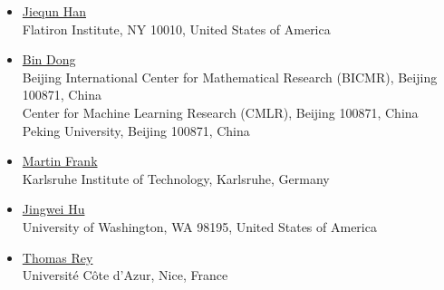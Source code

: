\begin{itemize}
\item {\underline{Jiequn Han}} \qquad {} \\
Flatiron Institute, NY 10010, United States of America

\item {\underline{Bin Dong}} \qquad {} \\
Beijing International Center for Mathematical Research (BICMR), Beijing 100871, China \\
Center for Machine Learning Research (CMLR), Beijing 100871, China \\
Peking University, Beijing 100871, China 

\item {\underline{Martin Frank}} \qquad {} \\
Karlsruhe Institute of Technology, Karlsruhe, Germany

\item {\underline{Jingwei Hu}} \qquad {} \\
University of Washington, WA 98195, United States of America

\item {\underline{Thomas Rey}} \qquad {} \\
Universit\'{e} C\^{o}te d'Azur, Nice, France





\end{itemize}



